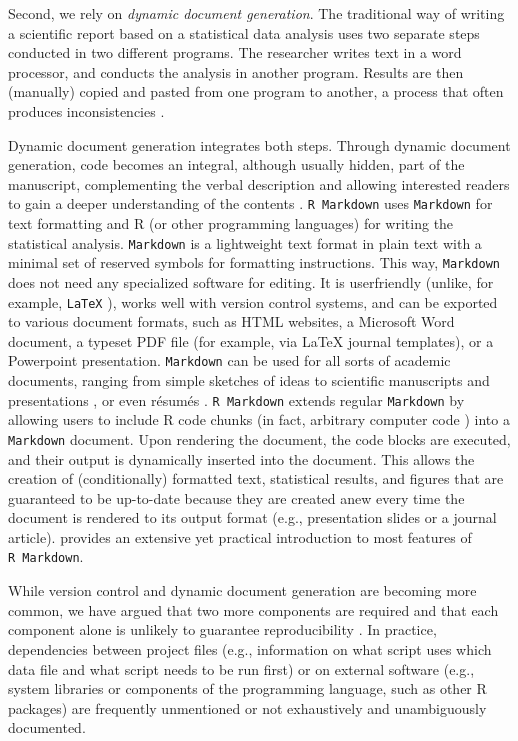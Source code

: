 \documentclass[psych,tutorial,submit,moreauthors,pdftex]{mdpi}
\begin{document}
Second, we rely on \emph{dynamic document generation}. The traditional
way of writing a scientific report based on a statistical data analysis
uses two separate steps conducted in two different programs. The
researcher writes text in a word processor, and conducts the analysis in
another program. Results are then (manually) copied and pasted from one
program to another, a process that often produces inconsistencies
\citep{nuijtenPrevalenceStatisticalReporting2016}.

Dynamic document generation integrates both steps. Through dynamic
document generation, code becomes an integral, although usually hidden,
part of the manuscript, complementing the verbal description and
allowing interested readers to gain a deeper understanding of the
contents
\citep{knuthCWEBSystemStructured, claerboutElectronicDocumentsGive1992}.
\texttt{R\ Markdown} uses \texttt{Markdown} for text formatting and R
(or other programming languages) for writing the statistical analysis.
\texttt{Markdown} is a lightweight text format in plain text with a
minimal set of reserved symbols for formatting instructions. This way,
\texttt{Markdown} does not need any specialized software for editing. It
is userfriendly (unlike, for example, \texttt{LaTeX}
\citep{lamportLATEXDocumentPreparation1994}), works well with version
control systems, and can be exported to various document formats, such
as HTML websites, a Microsoft Word document, a typeset PDF file (for
example, via LaTeX journal templates), or a Powerpoint presentation.
\texttt{Markdown} can be used for all sorts of academic documents,
ranging from simple sketches of ideas to scientific manuscripts
\citep{R-rticles} and presentations \citep{revealjs}, or even résumés
\citep{vitae}. \texttt{R\ Markdown} extends regular \texttt{Markdown} by
allowing users to include R code chunks (in fact, arbitrary computer
code \citep[Chapter 15, Chapter 15, Other
Languages]{xieMarkdownCookbook2020}) into a \texttt{Markdown} document.
Upon rendering the document, the code blocks are executed, and their
output is dynamically inserted into the document. This allows the
creation of (conditionally) formatted text, statistical results, and
figures that are guaranteed to be up-to-date because they are created
anew every time the document is rendered to its output format (e.g.,
presentation slides or a journal article).
\citet{xieMarkdownCookbook2020} provides an extensive yet practical
introduction to most features of \texttt{R\ Markdown}.

While version control and dynamic document generation are becoming more
common, we have argued that two more components are required and that
each component alone is unlikely to guarantee reproducibility
\citep{Peikert2019, vanlissa2020worcs}. In practice, dependencies
between project files (e.g., information on what script uses which data
file and what script needs to be run first) or on external software
(e.g., system libraries or components of the programming language, such
as other R packages) are frequently unmentioned or not exhaustively and
unambiguously documented.
\end{document}
